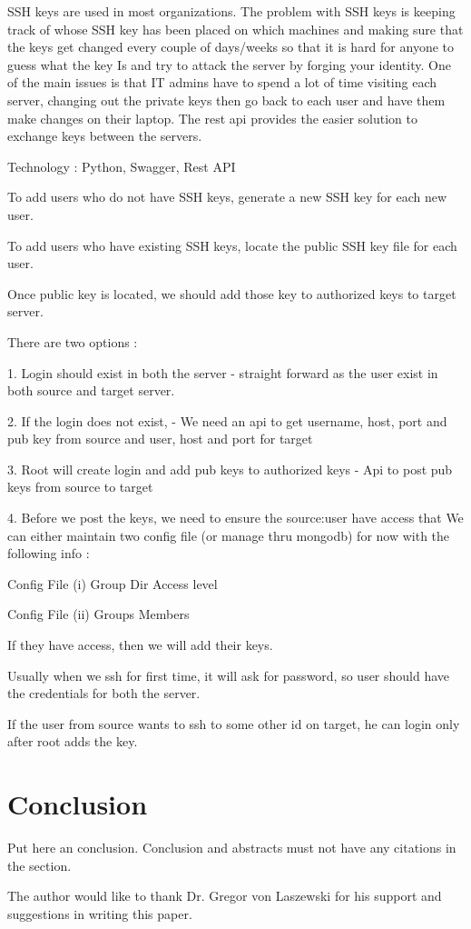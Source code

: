 SSH keys are used in most organizations. The problem with SSH keys is keeping 
track of whose SSH key has been placed on which machines and making sure that 
the keys get changed every couple of days/weeks so that it is hard for anyone 
to guess what the key Is and try to attack the server by forging your identity.
One of the main issues is that IT admins have to spend a lot of time visiting 
each server, changing out the private keys then go back to each user and have 
them make changes on their laptop. The rest api provides the easier solution to
exchange keys between the servers.

Technology : Python, Swagger, Rest API

To add users who do not have SSH keys, generate a new SSH key for each new user.

To add users who have existing SSH keys, locate the public SSH key file for each user.

Once public key is located, we should add those key to authorized keys 
to target server.

There are two options :

1. Login should exist in both the server - straight forward as the user exist 
         in both source and target server.

2. If the login does not exist,
        - We need an api to get username, host, port and pub key from source
            and user, host and port for target
        
3. Root will create login and  add pub keys to authorized keys
	- Api to post pub keys from source to target

4. Before we post the keys, we need to ensure the source:user have access that
   We can either maintain two config file (or manage thru mongodb) for now with the following info :

  Config File (i)  Group   Dir        Access level

  Config File (ii) Groups    Members
 
If they have access, then we will add their keys.

Usually when we ssh for first time, it will ask for password, so user should have the credentials for both
the server.

If the user from source wants to ssh to some other id on target, he can login only after root adds the key.


\section{Conclusion}

Put here an conclusion. Conclusion and abstracts must not have any
citations in the section.


\begin{acks}
The author would like to thank Dr. Gregor von Laszewski for his support and 
suggestions in writing this paper.
\end{acks}







